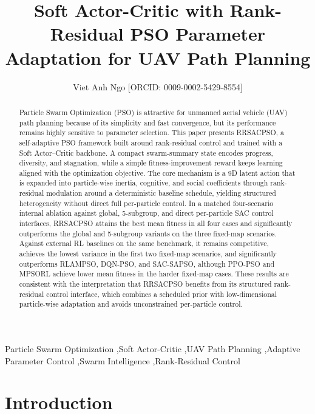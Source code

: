 \documentclass[final,5p,times]{elsarticle}
\providecommand{\orcid}[1]{\texorpdfstring{\,\href{https://orcid.org/#1}{\textcolor{ElsevierBlue}{\small[ORCID:\,#1]}}}{ [ORCID: #1]}}
\def\orcid#1{ [ORCID: #1]}%
\def\textcolor#1#2{#2}%
\def\small{}%
\begin{document}
\begin{frontmatter}
\title{Soft Actor-Critic with Rank-Residual PSO Parameter Adaptation for UAV Path Planning}
\author[aff1]{Viet Anh Ngo\orcid{0009-0002-5429-8554}}
\address[aff1]{School of Mechanical Engineering, Hanoi University of Science and Technology, No.~1 Dai Co Viet Road, Hai Ba Trung District, Hanoi, Vietnam}
\begin{abstract}
Particle Swarm Optimization (PSO) is attractive for unmanned aerial vehicle (UAV) path planning because of its simplicity and fast convergence, but its performance remains highly sensitive to parameter selection.
This paper presents RRSACPSO, a self-adaptive PSO framework built around rank-residual control and trained with a Soft Actor--Critic backbone.
A compact swarm-summary state encodes progress, diversity, and stagnation, while a simple fitness-improvement reward keeps learning aligned with the optimization objective.
The core mechanism is a 9D latent action that is expanded into particle-wise inertia, cognitive, and social coefficients through rank-residual modulation around a deterministic baseline schedule, yielding structured heterogeneity without direct full per-particle control.
In a matched four-scenario internal ablation against global, 5-subgroup, and direct per-particle SAC control interfaces, RRSACPSO attains the best mean fitness in all four cases and significantly outperforms the global and 5-subgroup variants on the three fixed-map scenarios.
Against external RL baselines on the same benchmark, it remains competitive, achieves the lowest variance in the first two fixed-map scenarios, and significantly outperforms RLAMPSO, DQN-PSO, and SAC-SAPSO, although PPO-PSO and MPSORL achieve lower mean fitness in the harder fixed-map cases.
These results are consistent with the interpretation that RRSACPSO benefits from its structured rank-residual control interface, which combines a scheduled prior with low-dimensional particle-wise adaptation and avoids unconstrained per-particle control.

\end{abstract}
\begin{keyword}
Particle Swarm Optimization \sep Soft Actor-Critic \sep UAV Path Planning \sep Adaptive Parameter Control \sep Swarm Intelligence \sep Rank-Residual Control
\end{keyword}
\end{frontmatter} \section{Introduction}
\end{document}
